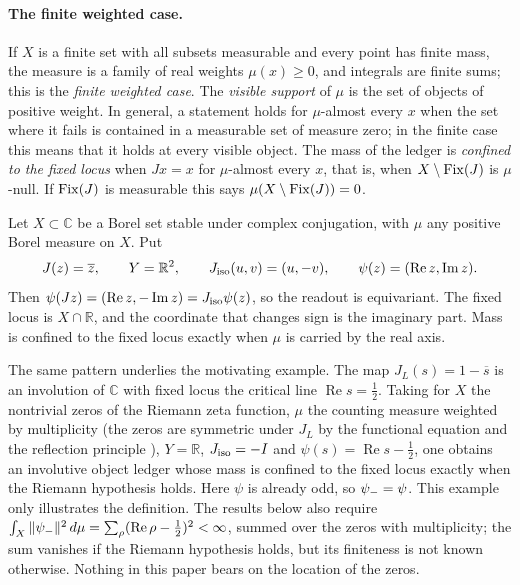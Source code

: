 \paragraph{The finite weighted case.}
If \(X\) is a finite set with all subsets measurable and every point
has finite mass, the measure is a family of real weights
\(\mu(x)\geq0\), and integrals are finite sums; this is the
\emph{finite weighted case}.  The \emph{visible support} of \(\mu\) is the set of objects of
positive weight.  In general, a statement holds for \(\mu\)-almost
every \(x\) when the set where it fails is contained in a measurable
set of measure zero; in the finite case this means that it holds at
every visible object.  The mass of the ledger is \emph{confined to the
fixed locus} when \(Jx=x\) for \(\mu\)-almost every \(x\), that is,
when \(X\setminus\operatorname{Fix}(J)\) is \(\mu\)-null.  If \(\operatorname{Fix}(J)\) is
measurable this says \(\mu(X\setminus\operatorname{Fix}(J))=0\).

\begin{example}
Let \(X\subset\mathbb{C}\) be a Borel set stable under complex
conjugation, with \(\mu\) any positive Borel measure on \(X\).  Put
\[
  J(z)=\overline{z},\qquad
  Y=\mathbb{R}^2,\qquad
  J_{\mathrm{iso}}(u,v)=(u,-v),\qquad
  \psi(z)=(\operatorname{Re}z,\operatorname{Im}z).
\]
Then \(\psi(Jz)=(\operatorname{Re}z,-\operatorname{Im}z)=J_{\mathrm{iso}}\psi(z)\),
so the readout is equivariant.  The fixed locus is \(X\cap\mathbb{R}\),
and the coordinate that changes sign is the imaginary part.  Mass is
confined to the fixed locus exactly when \(\mu\) is carried by the real
axis.
\end{example}

\begin{example}
The same pattern underlies the motivating example.  The map
\(J_L(s)=1-\overline{s}\) is an involution of \(\mathbb{C}\) with fixed
locus the critical line \(\operatorname{Re}s=\tfrac12\).  Taking for
\(X\) the nontrivial zeros of the Riemann zeta function, \(\mu\) the
counting measure weighted by multiplicity (the zeros are symmetric
under \(J_L\) by the functional equation and the reflection principle
\citep{TitchmarshHeathBrown1986}), \(Y=\mathbb{R}\),
\(J_{\mathrm{iso}}=-I\) and \(\psi(s)=\operatorname{Re}s-\tfrac12\), one obtains an
involutive object ledger whose mass is confined to the fixed locus
exactly when the Riemann hypothesis holds.  Here \(\psi\) is already
odd, so \(\psi_{-}=\psi\).  This example only illustrates the definition.
The results below also require
\(\int_X\|\psi_{-}\|^2\,d\mu=\sum_\rho(\operatorname{Re}\rho-\tfrac12)^2<\infty\),
summed over the zeros with multiplicity; the sum vanishes if the
Riemann hypothesis holds, but its finiteness is not known otherwise.
Nothing in this paper bears on the location of the zeros.
\end{example}
